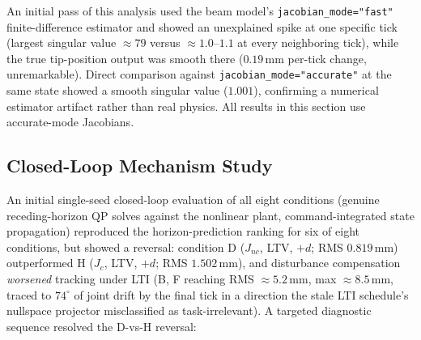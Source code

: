 \documentclass[journal]{IEEEtran}
\begin{document}
An initial pass of this analysis used the beam model's
\texttt{jacobian\_mode="fast"} finite-difference estimator and showed
an unexplained spike at one specific tick (largest singular value
$\approx79$ versus $\approx1.0$--$1.1$ at every neighboring tick),
while the true tip-position output was smooth there
($0.19\,\mathrm{mm}$ per-tick change, unremarkable). Direct comparison
against \texttt{jacobian\_mode="accurate"} at the same state showed a
smooth singular value ($1.001$), confirming a numerical estimator
artifact rather than real physics. All results in this section use
accurate-mode Jacobians.

\subsection{Closed-Loop Mechanism Study}
\label{sec:mn-exp4}

An initial single-seed closed-loop evaluation of all eight conditions
(genuine receding-horizon QP solves against the nonlinear plant,
command-integrated state propagation) reproduced the horizon-prediction
ranking for six of eight conditions, but showed a reversal: condition D
($J_{nc}$, LTV, $+d$; RMS $0.819\,\mathrm{mm}$) outperformed H
($J_c$, LTV, $+d$; RMS $1.502\,\mathrm{mm}$), and disturbance
compensation \emph{worsened} tracking under LTI (B, F reaching RMS
$\approx5.2\,\mathrm{mm}$, max $\approx8.5\,\mathrm{mm}$, traced to
$74^\circ$ of joint drift by the final tick in a direction the stale
LTI schedule's nullspace projector misclassified as task-irrelevant).
A targeted diagnostic sequence resolved the D-vs-H reversal:
\end{document}
